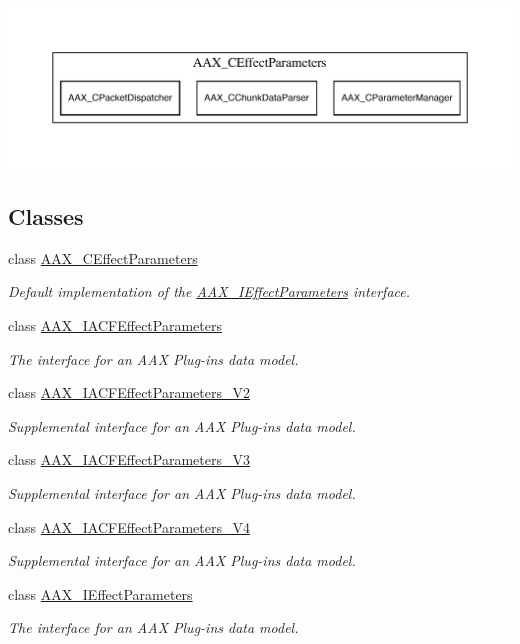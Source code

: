 \begin{DoxyImage}
\includegraphics[width=\textwidth,height=\textheight/2,keepaspectratio=true]{dot_aax_ieffectparams_contained}
\end{DoxyImage}
\subsection*{Classes}
\begin{DoxyCompactItemize}
\item 
class \mbox{\hyperlink{a01481}{A\+A\+X\+\_\+\+C\+Effect\+Parameters}}
\begin{DoxyCompactList}\small\item\em Default implementation of the \mbox{\hyperlink{a01825}{A\+A\+X\+\_\+\+I\+Effect\+Parameters}} interface. \end{DoxyCompactList}\item 
class \mbox{\hyperlink{a01669}{A\+A\+X\+\_\+\+I\+A\+C\+F\+Effect\+Parameters}}
\begin{DoxyCompactList}\small\item\em The interface for an A\+AX Plug-\/in\textquotesingle{}s data model. \end{DoxyCompactList}\item 
class \mbox{\hyperlink{a01677}{A\+A\+X\+\_\+\+I\+A\+C\+F\+Effect\+Parameters\+\_\+\+V2}}
\begin{DoxyCompactList}\small\item\em Supplemental interface for an A\+AX Plug-\/in\textquotesingle{}s data model. \end{DoxyCompactList}\item 
class \mbox{\hyperlink{a01681}{A\+A\+X\+\_\+\+I\+A\+C\+F\+Effect\+Parameters\+\_\+\+V3}}
\begin{DoxyCompactList}\small\item\em Supplemental interface for an A\+AX Plug-\/in\textquotesingle{}s data model. \end{DoxyCompactList}\item 
class \mbox{\hyperlink{a01685}{A\+A\+X\+\_\+\+I\+A\+C\+F\+Effect\+Parameters\+\_\+\+V4}}
\begin{DoxyCompactList}\small\item\em Supplemental interface for an A\+AX Plug-\/in\textquotesingle{}s data model. \end{DoxyCompactList}\item 
class \mbox{\hyperlink{a01825}{A\+A\+X\+\_\+\+I\+Effect\+Parameters}}
\begin{DoxyCompactList}\small\item\em The interface for an A\+AX Plug-\/in\textquotesingle{}s data model. \end{DoxyCompactList}\end{DoxyCompactItemize}
